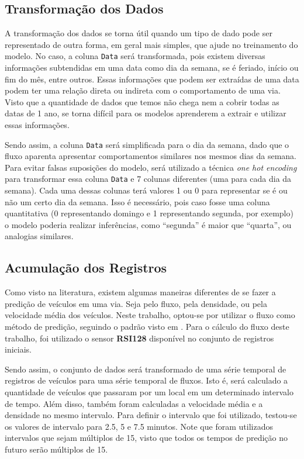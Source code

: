 \subsection{Transformação dos Dados}

A transformação dos dados se torna útil quando um tipo de dado pode ser representado de outra forma, em geral mais simples, que ajude no treinamento do modelo. No caso, a coluna \texttt{Data} será transformada, pois existem diversas informações subtendidas em uma data como dia da semana, se é feriado, início ou fim do mês, entre outros. Essas informações que podem ser extraídas de uma data podem ter uma relação direta ou indireta com o comportamento de uma via. Visto que a quantidade de dados que temos não chega nem a cobrir todas as datas de 1 ano, se torna difícil para os modelos aprenderem a extrair e utilizar essas informações. 

Sendo assim, a coluna \texttt{Data} será simplificada para o dia da semana, dado que o fluxo aparenta apresentar comportamentos similares nos mesmos dias da semana. Para evitar falsas suposições do modelo, será utilizado a técnica \textit{one hot encoding} para transformar essa coluna \texttt{Data} e 7 colunas diferentes (uma para cada dia da semana). Cada uma dessas colunas terá valores 1 ou 0 para representar se é ou não um certo dia da semana. Isso é necessário, pois caso fosse uma coluna quantitativa (0 representando domingo e 1 representando segunda, por exemplo) o modelo poderia realizar inferências, como ``segunda'' é maior que ``quarta'', ou analogias similares.

\subsection{Acumulação dos Registros}

Como visto na literatura, existem algumas maneiras diferentes de se fazer a predição de veículos em uma via. Seja pelo fluxo, pela densidade, ou pela velocidade média dos veículos. Neste trabalho, optou-se por utilizar o fluxo como método de predição, seguindo o padrão visto em \cite{lana_2018}. Para o cálculo do fluxo deste trabalho, foi utilizado o sensor \textbf{RSI128} disponível no conjunto de registros iniciais.

Sendo assim, o conjunto de dados será transformado de uma série temporal de registros de veículos para uma série temporal de fluxos. Isto é, será calculado a quantidade de veículos que passaram por um local em um determinado intervalo de tempo. Além disso, também foram calculadas a velocidade média e a densidade no mesmo intervalo. Para definir o intervalo que foi utilizado, testou-se os valores de intervalo para 2.5, 5 e 7.5 minutos. Note que foram utilizados intervalos que sejam múltiplos de 15, visto que todos os tempos de predição no futuro serão múltiplos de 15.

